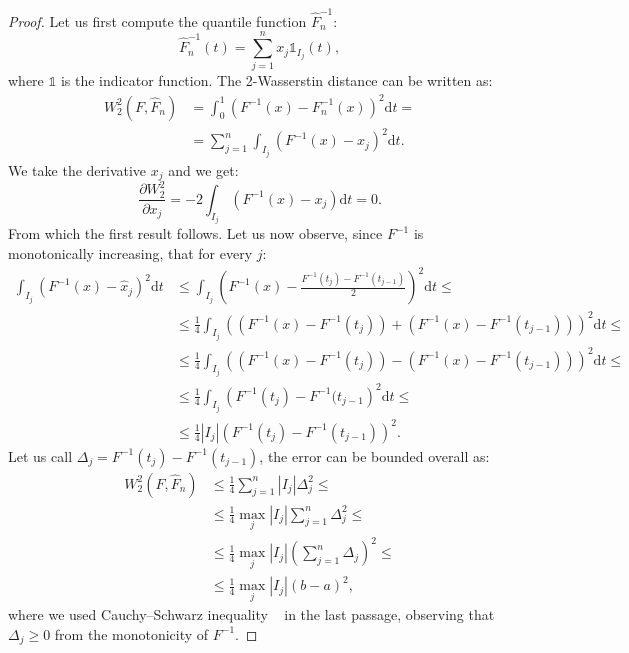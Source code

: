 \begin{proof}
	Let us first compute the quantile function $\widehat{F}_n^{-1}$:
    \begin{equation}
    	\widehat{F}_n^{-1}(t) = \sum_{j=1}^n x_j \mathds{1}_{I_j}(t),
    \end{equation}
    where $\mathds{1}$ is the indicator function. The 2-Wasserstin distance can be written as:
    \begin{align*}
    	W_2^2(F, \widehat{F}_n) & = \int_0^1 \left( F^{-1}(x) - F_n^{-1}(x) \right)^2 \mathrm{d} t = \\
        & = \sum_{j=1}^n \int_{I_j} \left( F^{-1}(x) - x_j \right)^2  \mathrm{d} t. 
    \end{align*}
    We take the derivative \wrt $x_j$ and we get:
    \begin{equation}
    	\frac{\partial W_2^2}{\partial x_j} = -2 \int_{I_j} \left( F^{-1}(x) - x_j \right)  \mathrm{d} t = 0.
    \end{equation}
    From which the first result follows. Let us now observe, since $F^{-1}$ is monotonically increasing, that for every $j$:
    \begin{align*}
    	\int_{I_j} \left(F^{-1}(x) - \widehat{x}_j\right)^2 \mathrm{d} t & \le \int_{I_j} \left(F^{-1}(x) - \frac{F^{-1}(t_j) - F^{-1}(t_{j-1}) }{2}\right)^2 \mathrm{d} t \le \\
        & \le\frac{1}{4} \int_{I_j} \left( (F^{-1}(x) - F^{-1}(t_j)) +  (F^{-1}(x) - F^{-1}(t_{j-1})) \right)^2 \mathrm{d} t \le \\
        & \le \frac{1}{4} \int_{I_j} \left( (F^{-1}(x) - F^{-1}(t_j)) -  (F^{-1}(x) - F^{-1}(t_{j-1})) \right)^2 \mathrm{d} t \le \\
       & \le\frac{1}{4} \int_{I_j} \left( F^{-1}(t_j) - F^{-1}(t_{j-1} \right)^2 \mathrm{d} t \le \\
       & \le \frac{1}{4} |I_j| \left( F^{-1}(t_j) - F^{-1}(t_{j-1}) \right)^2.
    \end{align*}
    Let us call $\Delta_j = F^{-1}(t_j) - F^{-1}(t_{j-1})$, the error can be bounded overall as:
    \begin{align*}
    	W_2^2(F, \widehat{F}_n) & \le \frac{1}{4}  \sum_{j=1}^n |I_j| \Delta_j ^2 \le \\
        & \le \frac{1}{4} \max_j |I_j| \sum_{j=1}^n \Delta_j ^2 \le \\
        & \le \frac{1}{4} \max_j |I_j| \left( \sum_{j=1}^n \Delta_j \right) ^2 \le \\
        & \le \frac{1}{4} \max_j |I_j| \left(b-a\right) ^2,
    \end{align*}
    where we used Cauchy–Schwarz inequality ~\cite{Steele:2004:CMC:993490} in the last passage, observing that $\Delta_j \ge 0$ from the monotonicity of $F^{-1}$.
\end{proof}

